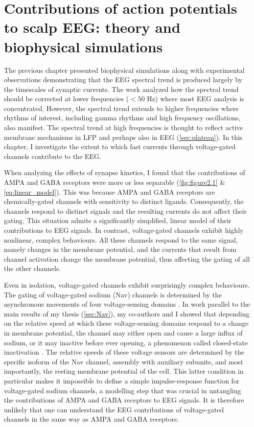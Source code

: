 \chapter{Contributions of action potentials to scalp EEG: theory and biophysical simulations}
\label{sec:apEEG}
\renewcommand{\figurename}{Fig}

The previous chapter presented biophysical simulations along with experimental observations demonstrating that the EEG spectral trend is produced largely by the timescales of synaptic currents. The work analyzed how the spectral trend should be corrected at lower frequencies ($<50$ \unit{\hertz}) where most EEG analysis is concentrated. However, the spectral trend extends to higher frequencies where rhythms of interest, including gamma rhythms and high frequency oscillations, also manifest. The spectral trend at high frequencies is thought to reflect active membrane mechanisms in LFP and perhaps also in EEG (\autoref{sec:plateau}). In this chapter, I investigate the extent to which fast currents through voltage-gated channels contribute to the EEG.

When analyzing the effects of synapse kinetics, I found that the contributions of AMPA and GABA receptors were more or less separable ({\autoref{fig:figure2.1}} \& \ref{eq:linear_model}). This was because AMPA and GABA receptors are chemically-gated channels with sensitivity to distinct ligands. Consequently, the channels respond to distinct signals and the resulting currents do not affect their gating. This situation admits a significantly simplified, linear model of their contributions to EEG signals. In contrast, voltage-gated channels exhibit highly nonlinear, complex behaviours. All these channels respond to the same signal, namely changes in the membrane potential, and the currents that result from channel activation change the membrane potential, thus affecting the gating of all the other channels.

Even in isolation, voltage-gated channels exhibit surprisingly complex behaviours. The gating of voltage-gated sodium (Nav) channels is determined by the asynchronous movements of four voltage-sensing domains \cite{Ahern2016}. In work parallel to the main results of my thesis  (\autoref{sec:Nav}), my co-authors and I showed that depending on the relative speed at which these voltage-sensing domains respond to a change in membrane potential, the channel may either open and cause a large influx of sodium, or it may inactive before ever opening, a phenomenon called closed-state inactivation \cite{Brake2022,Armstrong2006}. The relative speeds of these voltage sensors are determined by the specific isoform of the Nav channel, assembly with auxiliary subunits, and most importantly, the resting membrane potential of the cell. This latter condition in particular makes it impossible to define a simple impulse-response function for voltage-gated sodium channels, a modelling step that was crucial in untangling the contributions of AMPA and GABA receptors to EEG signals. It is therefore unlikely that one can understand the EEG contributions of voltage-gated channels in the same way as AMPA and GABA receptors.

